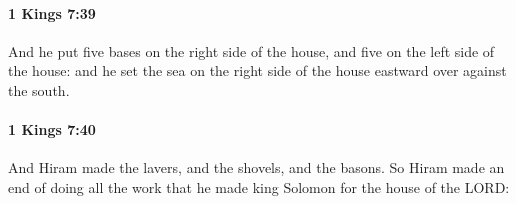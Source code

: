 		\paragraph{1 Kings 7:39} %
			\label{1KINGS-7-39}

			And he put five bases on the right side of the house, and five on the left side of the house: and he set the sea on the right side of the house eastward over against the south.


		\paragraph{1 Kings 7:40} %
			\label{1KINGS-7-40}

			And Hiram made the lavers, and the shovels, and the basons. So Hiram made an end of doing all the work that he made king Solomon for the house of the LORD:


